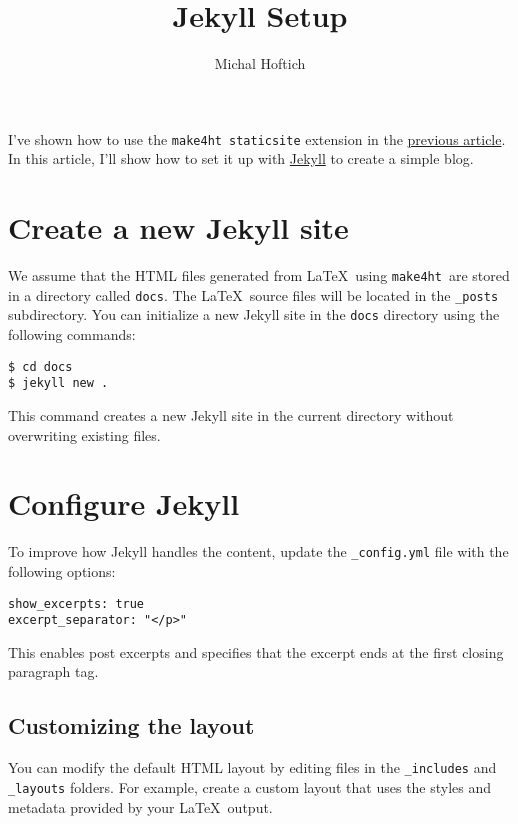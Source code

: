\documentclass{article}
\title{Jekyll Setup}
\author{Michal Hoftich}
\def\makeht{\texttt{make4ht}}
\begin{document}
\maketitle

I've shown how to use the \makeht\ \texttt{staticsite} extension in the \href{/testblog/2021/07/30/how-to-blog-with-tex4ht.html}{previous article}. In this article, I'll show how to set it up with \href{https://jekyllrb.com/}{Jekyll} to create a simple blog.

\tableofcontents

\section{Create a new Jekyll site}

We assume that the HTML files generated from \LaTeX\ using \makeht\ are stored in a directory called \texttt{docs}. The \LaTeX\ source files will be located in the \texttt{\_posts} subdirectory. You can initialize a new Jekyll site in the \texttt{docs} directory using the following commands:

\begin{verbatim}
$ cd docs
$ jekyll new .
\end{verbatim}

This command creates a new Jekyll site in the current directory without overwriting existing files.

\section{Configure Jekyll}

To improve how Jekyll handles the content, update the \texttt{\_config.yml} file with the following options:

\begin{verbatim}
show_excerpts: true
excerpt_separator: "</p>"
\end{verbatim}

This enables post excerpts and specifies that the excerpt ends at the first closing paragraph tag.

\subsection{Customizing the layout}

You can modify the default HTML layout by editing files in the \texttt{\_includes} and \texttt{\_layouts} folders. For example, create a custom layout that uses the styles and metadata provided by your \LaTeX\ output.
\end{document}
